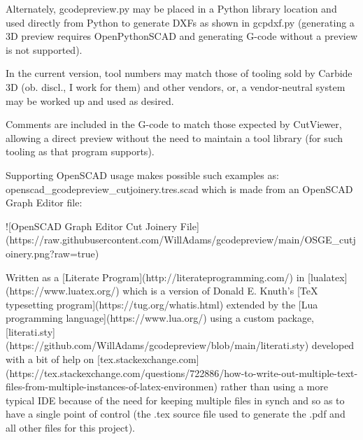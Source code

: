 \documentclass{ltxdoc}
\begin{document}
\begin{readme}
Alternately, gcodepreview.py may be placed in a Python library location and used directly from Python to generate DXFs as shown in gcpdxf.py (generating a 3D preview requires OpenPythonSCAD and generating G-code without a preview is not supported).

In the current version, tool numbers may match those of tooling sold by Carbide 3D (ob. discl., I work for them) and other vendors, or, a vendor-neutral system may be worked up and used as desired. 

Comments are included in the G-code to match those expected by CutViewer, allowing a direct preview without the need to maintain a tool library (for such tooling as that program supports).

Supporting OpenSCAD usage makes possible such examples as: openscad_gcodepreview_cutjoinery.tres.scad which is made from an OpenSCAD Graph Editor file:

![OpenSCAD Graph Editor Cut Joinery File](https://raw.githubusercontent.com/WillAdams/gcodepreview/main/OSGE_cutjoinery.png?raw=true)

Written as a [Literate Program](http://literateprogramming.com/) in [lualatex](https://www.luatex.org/) which is a version of Donald E. Knuth's [TeX typesetting program](https://tug.org/whatis.html) extended by the [Lua programming language](https://www.lua.org/) using a custom package, [literati.sty](https://github.com/WillAdams/gcodepreview/blob/main/literati.sty) developed with a bit of help on [tex.stackexchange.com](https://tex.stackexchange.com/questions/722886/how-to-write-out-multiple-text-files-from-multiple-instances-of-latex-environmen) rather than using a more typical IDE because of the need for keeping multiple files in synch and so as to have a single point of control (the .tex source file used to generate the .pdf and all other files for this project).


\end{readme}
\end{document}
